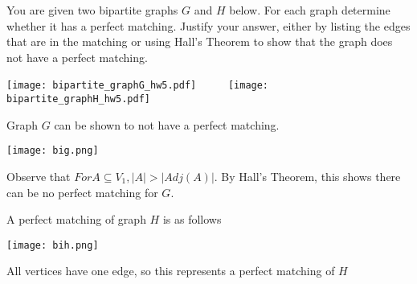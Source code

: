 
\begin{problem}
	You are given two bipartite graphs $G$ and $H$ below. For each
	graph determine whether it has a perfect matching.
	Justify your answer, either by 
	listing the edges that are in the matching or using
	Hall's Theorem to show that the graph does not have a
	perfect matching.

	\begin{center}
	\texttt{[image: bipartite\_graphG\_hw5.pdf]}
	\ \ \ \ \
	\texttt{[image: bipartite\_graphH\_hw5.pdf]}
	\end{center}
\end{problem}

\begin{solution}
  Graph $G$ can be shown to not have a perfect matching.

	\begin{center}
	\texttt{[image: big.png]}
	\end{center}

  Observe that $For A \subseteq V_1, |A| > |Adj(A)|$. By Hall's Theorem, this shows there can be no perfect matching for $G$.

\bigskip

A perfect matching of graph $H$ is as follows

	\begin{center}
	\texttt{[image: bih.png]}
	\end{center}

All vertices have one edge, so this represents a perfect matching of $H$
\end{solution}




